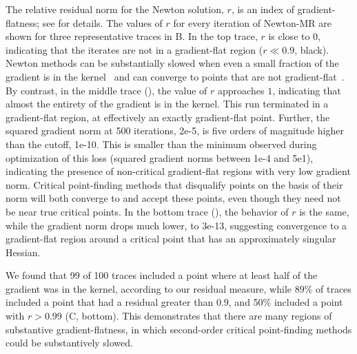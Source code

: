 \documentclass[../../thesis.tex]{subfiles}
\begin{document}
The relative residual norm for the Newton solution, $r$,
is an index of gradient-flatness;
see  for details.
The values of $r$ for every iteration
of Newton-MR are shown for three representative traces
in B.
In the top trace,
$r$ is close to 0,
indicating that the iterates are not in a gradient-flat region
($r\ll0.9$, black).
Newton methods can be substantially slowed when even a small fraction
of the gradient is in the kernel~\cite{griewank1983}
and can converge to points that are not gradient-flat~\cite{byrd2004}.
By contrast, in the middle trace (\failcolor{}),
the value of $r$ approaches $1$,
indicating that almost the entirety of the gradient is in the kernel.
This run terminated in a gradient-flat region,
at effectively an exactly gradient-flat point.
Further, the squared gradient norm at 500 iterations, 2e-5,
is five orders of magnitude higher than the cutoff,
1e-10.
This is smaller than the minimum observed during optimization
of this loss (squared gradient norms between 1e-4 and 5e1),
indicating the presence of non-critical gradient-flat regions
with very low gradient norm.
Critical point-finding methods that disqualify points
on the basis of their norm will both converge to
and accept these points,
even though they need not be near true critical points.
In the bottom trace (\successcolor{}),
the behavior of $r$ is the same,
while the gradient norm drops much lower, to 3e-13,
suggesting convergence to a gradient-flat region around a critical point
that has an approximately singular Hessian.

We found that 99 of 100 traces included a point
where at least half of the gradient was in the kernel,
according to our residual measure,
while 89\% of traces included a point that had
a residual greater than $0.9$,
and 50\% included a point with $r > 0.99$
(C, bottom).
This demonstrates that
there are many regions of substantive gradient-flatness,
in which second-order critical point-finding methods could be substantively slowed.
\end{document}
